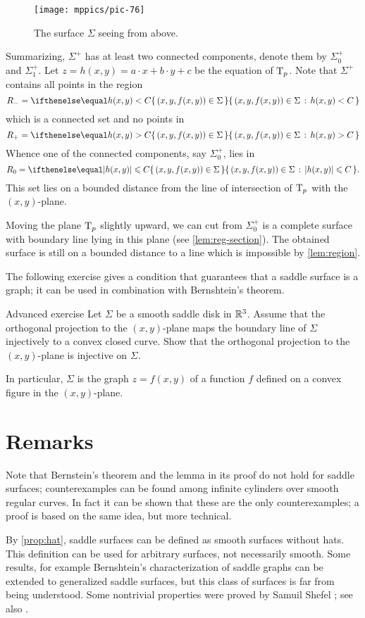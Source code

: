 \begin{figure}[h!]
\vskip-0mm
\centering
\texttt{[image: mppics/pic-76]}
\caption*{The surface $\Sigma$ seeing from above.}
\vskip0mm
\end{figure}

Summarizing, $\Sigma^+$ has at least two connected components, denote them by $\Sigma^+_0$ and $\Sigma^+_1$.
Let $z=h(x,y)=a\cdot x+b\cdot y+c$ be the equation of $\mathrm{T}_p$.
Note that $\Sigma^+$ contains all points in the region
\[R_-=\set{(x,y,f(x,y))\in\Sigma}{h(x,y)< C}\] 
which is a connected set and no points in 
\[R_+=\set{(x,y,f(x,y))\in\Sigma}{h(x,y)> C}\]
Whence one of the connected components, say $\Sigma^+_0$, lies in 
\[R_0=\set{(x,y,f(x,y))\in\Sigma}{|h(x,y)|\le  C}.\]
This set lies on a bounded distance from the line of intersection of $\mathrm{T}_p$ with the $(x,y)$-plane.

Moving the plane $\mathrm{T}_p$ slightly upward, we can cut from $\Sigma^+_0$ is a complete surface with boundary line lying in this plane (see \ref{lem:reg-section}).
The obtained surface is still on a bounded distance to a line
which is impossible by \ref{lem:region}.
\qeds

The following exercise gives a condition that guarantees that a saddle surface is a graph;
it can be used in combination with Bernshtein's theorem.

\begin{thm}{Advanced exercise}
Let $\Sigma$ be a smooth saddle disk in $\mathbb{R}^3$.
Assume that the orthogonal projection to the $(x,y)$-plane
maps the boundary line of $\Sigma$
injectively to a convex closed curve.
Show that the orthogonal projection to the $(x,y)$-plane is injective on $\Sigma$.

In particular, $\Sigma$ is the graph $z=f(x,y)$ of a function $f$ defined on a convex figure in the $(x,y)$-plane.
\end{thm}


\section*{Remarks}

Note that Bernstein's theorem and the lemma in its proof do not hold for saddle surfaces;
counterexamples can be found among infinite cylinders over smooth regular curves.
In fact it can be shown that these are the only counterexamples;
a proof is based on the same idea, but more technical.

By \ref{prop:hat}, saddle surfaces can be defined as smooth surfaces without hats.
This definition can be used for arbitrary surfaces, not necessarily smooth.
Some results, for example Bernshtein's characterization of saddle graphs can be extended to generalized saddle surfaces, but this class of surfaces is far from being understood.
Some nontrivial properties were proved by Samuil Shefel \cite{shefel}; see also \cite[Capter 4]{akp}.
